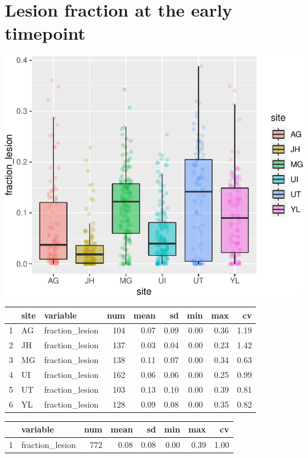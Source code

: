 \documentclass[
]{article}
\begin{document}
\hypertarget{lesion-fraction-at-the-early-timepoint}{%
\section{Lesion fraction at the early
timepoint}\label{lesion-fraction-at-the-early-timepoint}}

\begin{center}\includegraphics{paper_files/figure-latex/plot_fraction_lesion_early-1} \end{center}

\begin{table}[ht]
\centering
\begin{tabular}{rllrrrrrr}
  \hline
 & site & variable & num & mean & sd & min & max & cv \\ 
  \hline
1 & AG & fraction\_lesion & 104 & 0.07 & 0.09 & 0.00 & 0.36 & 1.19 \\ 
  2 & JH & fraction\_lesion & 137 & 0.03 & 0.04 & 0.00 & 0.23 & 1.42 \\ 
  3 & MG & fraction\_lesion & 138 & 0.11 & 0.07 & 0.00 & 0.34 & 0.63 \\ 
  4 & UI & fraction\_lesion & 162 & 0.06 & 0.06 & 0.00 & 0.25 & 0.99 \\ 
  5 & UT & fraction\_lesion & 103 & 0.13 & 0.10 & 0.00 & 0.39 & 0.81 \\ 
  6 & YL & fraction\_lesion & 128 & 0.09 & 0.08 & 0.00 & 0.35 & 0.82 \\ 
   \hline
\end{tabular}
\end{table}
\begin{table}[ht]
\centering
\begin{tabular}{rlrrrrrr}
  \hline
 & variable & num & mean & sd & min & max & cv \\ 
  \hline
1 & fraction\_lesion & 772 & 0.08 & 0.08 & 0.00 & 0.39 & 1.00 \\ 
   \hline
\end{tabular}
\end{table}
\end{document}
